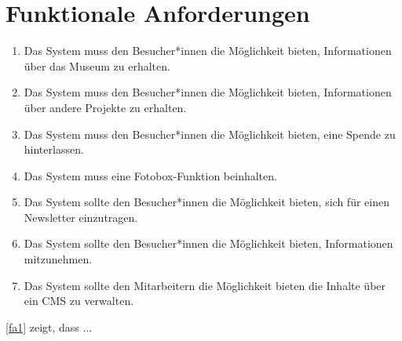 \section{Funktionale Anforderungen}
\label{funktionale}

\begin{enumerate}[label=FA\arabic*]
	\item\label{fa1} Das System muss den Besucher*innen die Möglichkeit bieten, Informationen über das Museum zu erhalten.
	\item\label{fa2} Das System muss den Besucher*innen die Möglichkeit bieten, Informationen über andere Projekte zu erhalten.
  \item\label{fa3} Das System muss den Besucher*innen die Möglichkeit bieten, eine Spende zu hinterlassen.
  \item\label{fa4} Das System muss eine Fotobox-Funktion beinhalten.
  \item\label{fa5} Das System sollte den Besucher*innen die Möglichkeit bieten, sich für einen Newsletter einzutragen.
  \item\label{fa6} Das System sollte den Besucher*innen die Möglichkeit bieten, Informationen mitzunehmen.
  \item\label{fa7} Das System sollte den Mitarbeitern die Möglichkeit bieten die Inhalte über ein CMS zu verwalten.
\end{enumerate}


\ref{fa1} zeigt, dass ...
